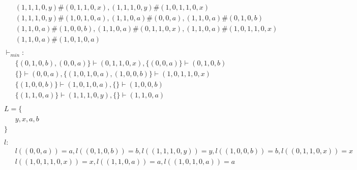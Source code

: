 \begin{align*}
	 & \qquad (1, 1, 1, 0, y) \# (0, 1, 1, 0, x), (1, 1, 1, 0, y) \# (1, 0, 1, 1, 0, x) \\ 
	 & \qquad (1, 1, 1, 0, y) \# (1, 0, 1, 0, a), (1, 1, 0, a) \# (0, 0, a), (1, 1, 0, a) \# (0, 1, 0, b) \\ 
	 & \qquad (1, 1, 0, a) \# (1, 0, 0, b), (1, 1, 0, a) \# (0, 1, 1, 0, x), (1, 1, 0, a) \# (1, 0, 1, 1, 0, x) \\ 
	 & \qquad (1, 1, 0, a) \# (1, 0, 1, 0, a) \\ 
	 & \ \  & \\ 
	 & \ \ \vdash_{{min}}: & \\ 
	 & \qquad \{ (0, 1, 0, b), (0, 0, a) \} \vdash (0, 1, 1, 0, x), \{ (0, 0, a) \} \vdash (0, 1, 0, b) \\ 
	 & \qquad \{  \} \vdash (0, 0, a), \{ (1, 0, 1, 0, a), (1, 0, 0, b) \} \vdash (1, 0, 1, 1, 0, x) \\ 
	 & \qquad \{ (1, 0, 0, b) \} \vdash (1, 0, 1, 0, a), \{  \} \vdash (1, 0, 0, b) \\ 
	 & \qquad \{ (1, 1, 0, a) \} \vdash (1, 1, 1, 0, y), \{  \} \vdash (1, 1, 0, a) \\ 
	 & \ \  & \\ 
	 & \ \ L=\{ & \\ 
	 & \qquad y, x, a, b \\ 
	 & \ \ \} & \\ 
	 & \ \  & \\ 
	 & \ \ l: & \\ 
	 & \qquad l((0, 0, a)) = a, l((0, 1, 0, b)) = b, l((1, 1, 1, 0, y)) = y, l((1, 0, 0, b)) = b, l((0, 1, 1, 0, x)) = x \\ 
	 & \qquad l((1, 0, 1, 1, 0, x)) = x, l((1, 1, 0, a)) = a, l((1, 0, 1, 0, a)) = a \\ 
	 & \ \  & \\ 
\end{align*} 

